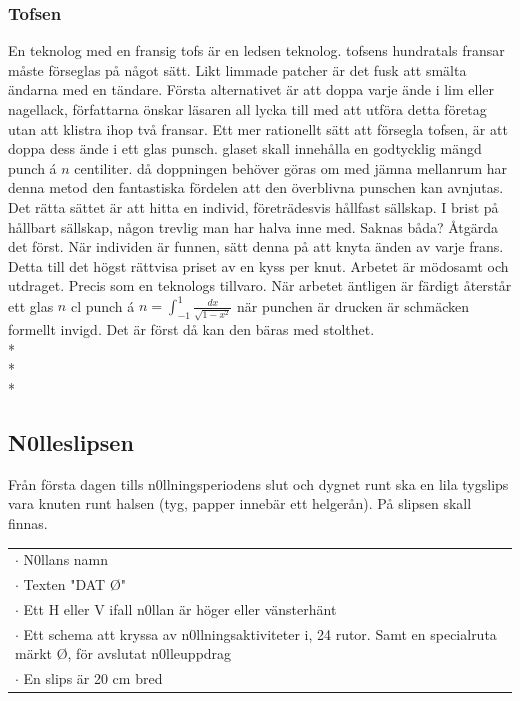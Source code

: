 \subsubsection*{\textbf{Tofsen}}
En teknolog med en fransig tofs är en ledsen teknolog. tofsens hundratals fransar måste förseglas på något sätt. Likt limmade patcher är det fusk att smälta
ändarna med en tändare. Första alternativet är att doppa varje ände i lim eller nagellack, författarna önskar läsaren all lycka till med att utföra detta
företag utan att klistra ihop två fransar. Ett mer rationellt sätt att försegla tofsen, är att doppa dess ände i ett glas punsch. glaset skall innehålla 
en godtycklig mängd punch á $n$ centiliter. då doppningen behöver göras om med jämna mellanrum har denna metod den fantastiska fördelen att den överblivna 
punschen kan avnjutas. Det rätta sättet är att hitta en individ, företrädesvis hållfast sällskap. I brist på hållbart sällskap, någon trevlig man har halva inne med.
Saknas båda? Åtgärda det först. När individen är funnen, sätt denna på att knyta änden av varje frans. Detta till det högst rättvisa priset av en kyss per knut.
Arbetet är mödosamt och utdraget. Precis som en teknologs tillvaro. När arbetet äntligen är färdigt återstår ett glas $n$ cl punch á $n =\int_{-1}^{1} \frac{dx}{\sqrt{1-x^2}}$
när punchen är drucken är schmäcken formellt invigd. Det är först då kan den bäras med stolthet.\\*
\\*
\\*

\newpage

\subsection*{\textbf{N0lleslipsen}}
Från första dagen tills n0llningsperiodens slut och dygnet runt ska en lila tygslips vara knuten runt halsen (tyg, papper innebär ett helgerån).
På slipsen skall finnas.\\
\begin{tabular}{p{\textwidth}}
    $\cdot$ N0llans namn\\
    $\cdot$ Texten "DAT Ø"\\
    $\cdot$ Ett H eller V ifall n0llan är höger eller vänsterhänt\\
    $\cdot$ Ett schema att kryssa av n0llningsaktiviteter i, 24 rutor. Samt en specialruta märkt Ø, för avslutat n0lleuppdrag\\
    $\cdot$ En slips är 20 cm bred
\end{tabular}

